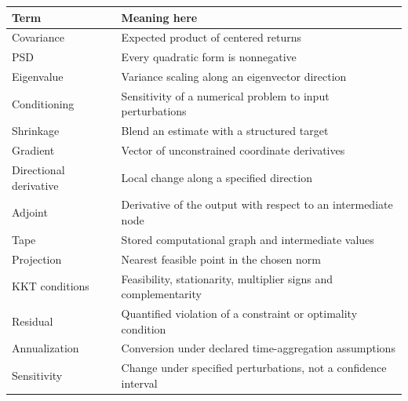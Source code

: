 \documentclass[
  american,
  11pt,
]{article}
\newcounter{none} %
\begin{document}
{\def\LTcaptype{none} %
\begin{longtable}[]{@{}
  >{\raggedright\arraybackslash}p{}
  >{\raggedright\arraybackslash}p{}@{}}
\toprule\noalign{}
\begin{minipage}[b]{\linewidth}\raggedright
Term
\end{minipage} & \begin{minipage}[b]{\linewidth}\raggedright
Meaning here
\end{minipage} \\
\midrule\noalign{}
\endhead
\bottomrule\noalign{}
\endlastfoot
Covariance & Expected product of centered returns \\
PSD & Every quadratic form is nonnegative \\
Eigenvalue & Variance scaling along an eigenvector direction \\
Conditioning & Sensitivity of a numerical problem to input
perturbations \\
Shrinkage & Blend an estimate with a structured target \\
Gradient & Vector of unconstrained coordinate derivatives \\
Directional derivative & Local change along a specified direction \\
Adjoint & Derivative of the output with respect to an intermediate
node \\
Tape & Stored computational graph and intermediate values \\
Projection & Nearest feasible point in the chosen norm \\
KKT conditions & Feasibility, stationarity, multiplier signs and
complementarity \\
Residual & Quantified violation of a constraint or optimality
condition \\
Annualization & Conversion under declared time-aggregation
assumptions \\
Sensitivity & Change under specified perturbations, not a confidence
interval \\
\end{longtable}
}
\end{document}
